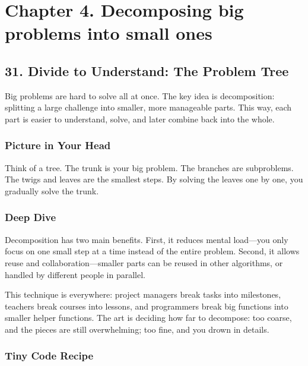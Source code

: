 \documentclass[
  letterpaper,
  DIV=11,
  numbers=noendperiod]{scrreprt}
\begin{document}
\section{Chapter 4. Decomposing big problems into small
ones}\label{chapter-4.-decomposing-big-problems-into-small-ones}

\subsection{31. Divide to Understand: The Problem
Tree}\label{divide-to-understand-the-problem-tree}

Big problems are hard to solve all at once. The key idea is
decomposition: splitting a large challenge into smaller, more manageable
parts. This way, each part is easier to understand, solve, and later
combine back into the whole.

\subsubsection{Picture in Your Head}\label{picture-in-your-head-30}

Think of a tree. The trunk is your big problem. The branches are
subproblems. The twigs and leaves are the smallest steps. By solving the
leaves one by one, you gradually solve the trunk.

\subsubsection{Deep Dive}\label{deep-dive}

Decomposition has two main benefits. First, it reduces mental load---you
only focus on one small step at a time instead of the entire problem.
Second, it allows reuse and collaboration---smaller parts can be reused
in other algorithms, or handled by different people in parallel.

This technique is everywhere: project managers break tasks into
milestones, teachers break courses into lessons, and programmers break
big functions into smaller helper functions. The art is deciding how far
to decompose: too coarse, and the pieces are still overwhelming; too
fine, and you drown in details.

\subsubsection{Tiny Code Recipe}\label{tiny-code-recipe-28}
\end{document}
